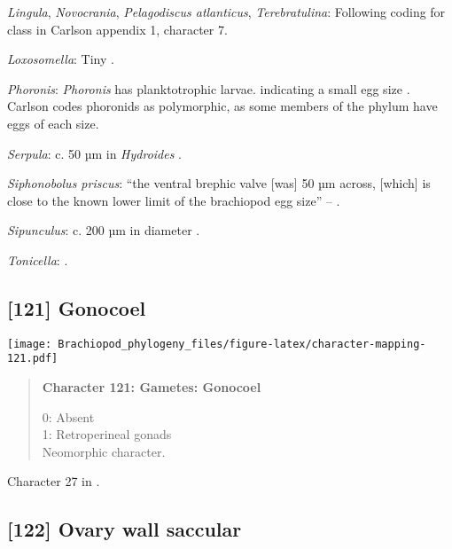 \documentclass[openany]{book}
\theoremstyle{definition}
\theoremstyle{definition}
\theoremstyle{definition}
\theoremstyle{remark}
\begin{document}
\hypertarget{Lingula-coding-120}{}
\emph{Lingula}, \emph{Novocrania}, \emph{Pelagodiscus atlanticus},
\emph{Terebratulina}: Following coding for class in Carlson
\citeyearpar{Carlson1995Phylogeneticrelationships} appendix 1, character
7.

\hypertarget{Loxosomella-coding-120}{}
\emph{Loxosomella}: Tiny \citep{Nielsen1966}.

\hypertarget{Phoronis-coding-120}{}
\emph{Phoronis}: \emph{Phoronis} has planktotrophic larvae. indicating a
small egg size \citep{Ruppert2004Invertebratezoology}. Carlson
\citeyearpar{Carlson1995Phylogeneticrelationships} codes phoronids as
polymorphic, as some members of the phylum have eggs of each size.

\hypertarget{Serpula-coding-120}{}
\emph{Serpula}: c. 50 µm in \emph{Hydroides} \citep{Miles2007}.

\hypertarget{Siphonobolus_priscus-coding-120}{}
\emph{Siphonobolus priscus}: ``the ventral brephic valve {[}was{]} 50 µm
across, {[}which{]} is close to the known lower limit of the brachiopod
egg size'' -- \citet{Popov2009Earlyontogeny}.

\hypertarget{Sipunculus-coding-120}{}
\emph{Sipunculus}: c. 200 µm in diameter \citep{Rice1988}.

\hypertarget{Tonicella-coding-120}{}
\emph{Tonicella}: \citet{BucklandNicks1988}.

\subsection*{{[}121{]} Gonocoel}\label{gonocoel}

\texttt{[image: Brachiopod\_phylogeny\_files/figure-latex/character-mapping-121.pdf]}

\begin{quote}
\textbf{Character 121: Gametes: Gonocoel}

0: Absent\\
1: Retroperineal gonads\\
Neomorphic character.
\end{quote}

Character 27 in \citet{Haszprunar1996}.

\subsection*{{[}122{]} Ovary wall saccular}\label{ovary-wall-saccular}
\end{document}
